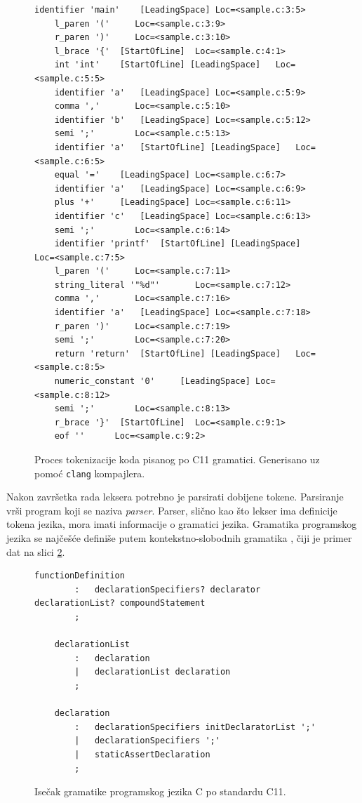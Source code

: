 \begin{figure}[h!]
    \begin{lstlisting}[language={}]
    identifier 'main'	 [LeadingSpace]	Loc=<sample.c:3:5>
    l_paren '('		Loc=<sample.c:3:9>
    r_paren ')'		Loc=<sample.c:3:10>
    l_brace '{'	 [StartOfLine]	Loc=<sample.c:4:1>
    int 'int'	 [StartOfLine] [LeadingSpace]	Loc=<sample.c:5:5>
    identifier 'a'	 [LeadingSpace]	Loc=<sample.c:5:9>
    comma ','		Loc=<sample.c:5:10>
    identifier 'b'	 [LeadingSpace]	Loc=<sample.c:5:12>
    semi ';'		Loc=<sample.c:5:13>
    identifier 'a'	 [StartOfLine] [LeadingSpace]	Loc=<sample.c:6:5>
    equal '='	 [LeadingSpace]	Loc=<sample.c:6:7>
    identifier 'a'	 [LeadingSpace]	Loc=<sample.c:6:9>
    plus '+'	 [LeadingSpace]	Loc=<sample.c:6:11>
    identifier 'c'	 [LeadingSpace]	Loc=<sample.c:6:13>
    semi ';'		Loc=<sample.c:6:14>
    identifier 'printf'	 [StartOfLine] [LeadingSpace]	Loc=<sample.c:7:5>
    l_paren '('		Loc=<sample.c:7:11>
    string_literal '"%d"'		Loc=<sample.c:7:12>
    comma ','		Loc=<sample.c:7:16>
    identifier 'a'	 [LeadingSpace]	Loc=<sample.c:7:18>
    r_paren ')'		Loc=<sample.c:7:19>
    semi ';'		Loc=<sample.c:7:20>
    return 'return'	 [StartOfLine] [LeadingSpace]	Loc=<sample.c:8:5>
    numeric_constant '0'	 [LeadingSpace]	Loc=<sample.c:8:12>
    semi ';'		Loc=<sample.c:8:13>
    r_brace '}'	 [StartOfLine]	Loc=<sample.c:9:1>
    eof ''		Loc=<sample.c:9:2>
    \end{lstlisting}
    \caption{Proces tokenizacije koda pisanog po C11 gramatici. Generisano
    uz pomoć \texttt{clang} \cite{Clang} kompajlera.}
    \label{fig:CompilationProcessLex}
\end{figure}

Nakon završetka rada leksera potrebno je parsirati dobijene tokene.
Parsiranje vrši program koji se naziva \emph{parser}. Parser, slično
kao što lekser ima definicije tokena jezika, mora imati informacije 
o gramatici jezika. Gramatika programskog jezika se najčešće definiše
putem kontekstno-slobodnih gramatika \cite{ContextFreeGrammars}, 
čiji je primer dat na slici \ref{fig:CompilationProcessGram}.

\begin{figure}[h!]
    \begin{lstlisting}[language={}]
    functionDefinition
        :   declarationSpecifiers? declarator declarationList? compoundStatement
        ;

    declarationList
        :   declaration
        |   declarationList declaration
        ;

    declaration
        :   declarationSpecifiers initDeclaratorList ';'
        | 	declarationSpecifiers ';'
        |   staticAssertDeclaration
        ;
    \end{lstlisting}
    \caption{Isečak gramatike programskog jezika C po standardu C11.}
    \label{fig:CompilationProcessGram}
\end{figure}

